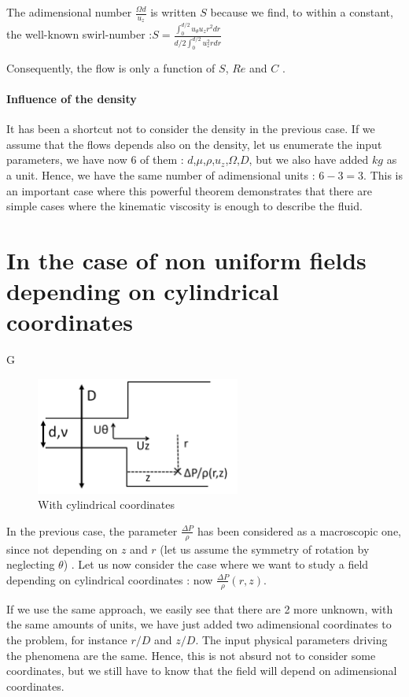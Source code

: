 The adimensional number $\frac{\Omega d}{u_{z}}$ is written $S$ because we find, to within a constant, the well-known swirl-number :$S=\frac{\int_{0}^{d/2} u_{\theta} u_{z} r^2 dr}{d/2\int_{0}^{d/2}  u_{z}^2 r dr}$ 

Consequently, the flow is only a function of $S$, $Re$ and $C$ .

\paragraph{Influence of the density}

It has been a shortcut not to consider the density in the previous case. If we assume that the flows depends also on the density, let us enumerate the input parameters, we have now 6 of them : $d$,$\mu$,$\rho$,$u_{z}$,$\Omega$,$D$, but we also have added $kg$ as a unit. Hence, we have the same number of adimensional units : $6-3=3$. This is an important case where this powerful theorem demonstrates that there are simple cases where the kinematic viscosity is enough to describe the fluid.

\section{In the case of non uniform fields depending on cylindrical coordinates}

G\begin{figure}[!h]
  \centering
\includegraphics[width=0.6\textwidth]{fig/Schema_Vashy2.png}
  \caption{With cylindrical coordinates}
 \label{Vaschy2}
\end{figure}
In the previous case, the parameter $\frac{\Delta P}{\rho}$ has been considered as a macroscopic one, since not depending on $z$ and $r$ (let us assume the symmetry of rotation by neglecting $\theta$) . Let us now consider the case where we want to study a field depending on cylindrical coordinates : now $\frac{\Delta P}{\rho}(r,z)$. 

If we use the same approach, we easily see that there are 2 more unknown, with the same amounts of units, we have just added two adimensional coordinates to the problem, for instance $r/D$ and $z/D$. The input physical parameters driving the phenomena are the same. Hence, this is not absurd not to consider some coordinates, but we still have to know that the field will depend on adimensional coordinates.

